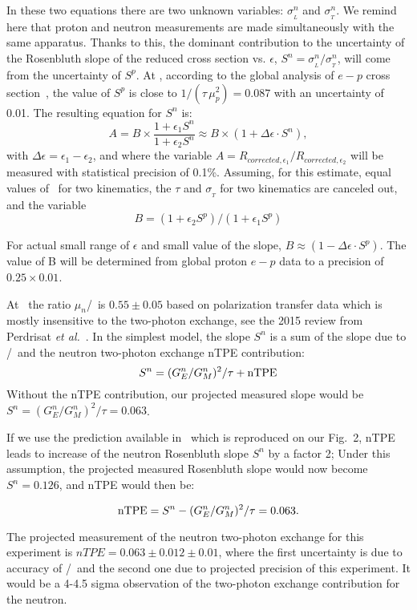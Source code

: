 In these two equations there are two unknown variables: $\sigma_{_L}^n$ and $\sigma_{_T}^n$.
We remind here that proton and neutron measurements are made simultaneously with the same apparatus. 
Thanks to this, the dominant contribution to the uncertainty of the Rosenbluth slope of the reduced cross section vs. $\epsilon$,  
$S^n = \sigma_{_L}^n/ \sigma_{_T}^n$, will come from the uncertainty of $S^p$.
At  \gevcsq, according to the global analysis of $e-p$ cross section~\cite{Christy2020ab}, the value of $S^p$ is close to $1/(\tau \, \mu_p^2) = 0.087$ with an uncertainty of 0.01.
The resulting equation for $S^n$ is:
\begin{equation*}
A = B \times \frac{1 + \epsilon_1 S^n}{1 + \epsilon_2 S^n} \approx B \times (1 +  \Delta \epsilon \cdot S^n),
\end{equation*}
with $\Delta \epsilon = \epsilon_1 -\epsilon_2$, and 
where the variable $A = R_{{corrected},\epsilon_1}/R_{{corrected},\epsilon_2}$ will be measured with statistical precision of 0.1\%.  
Assuming, for this estimate, equal values of \qsq~for two kinematics, the  $\tau$ and $\sigma_{_T}$ for two kinematics are canceled out, and the variable
\begin{equation}
  B = %
  (1 + \epsilon_2 S^p )/(1 + \epsilon_1 S^p )
\end{equation}

For actual small range of $\epsilon$ and small value of the slope, $B \approx (1 - \Delta \epsilon \cdot S^p)$.
The value of B will be determined from global proton $e-p$ data to a precision of $0.25 \times 0.01$.
 
At  \gevcsq~the ratio $\mu_n$\gen/\gmn~is $0.55 \pm 0.05$ based on polarization transfer data which is mostly insensitive to the two-photon exchange, see the 2015 review from Perdrisat {\it et al.}~\cite{Punjabi:2015bba}.
%
In the simplest model, the slope $S^n$ is a sum of the slope due to \gen/\gmn~and the neutron two-photon exchange nTPE contribution:
\begin{equation}
  S^n = (G_E^n/G_M^n)^2/\tau + {\rm nTPE}
\end{equation}
Without the nTPE contribution, our projected measured slope would be $S^n = (G_E^n/G_M^n)^2/\tau = 0.063$. %

If we use the prediction available in~\cite{Blunden:2005ew} which is reproduced on our Fig.~2, nTPE leads to increase of the neutron Rosenbluth slope $S^n$ by a factor 2;
Under this assumption, the projected measured Rosenbluth slope would now become $S^n = 0.126$, and nTPE would then be:

\begin{equation}
  {\rm nTPE} = S^n - (G_E^n/G_M^n)^2/\tau = 0.063.
\end{equation}

The projected measurement of the neutron two-photon exchange for this experiment is $nTPE = 0.063 \pm 0.012 \pm 0.01$, where the first uncertainty is due to accuracy 
of \gen/\gmn~and the second one due to projected precision of this experiment. It would be a 4-4.5 sigma observation of the two-photon exchange contribution for the neutron.
